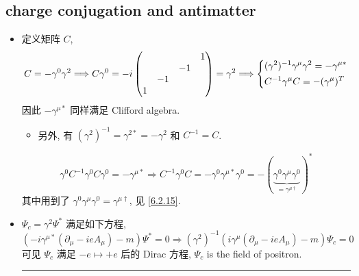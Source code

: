 \subsection{charge conjugation and antimatter}
\begin{itemize}
	\item 定义矩阵 $C$,
	\begin{equation}
		C = - \gamma^0 \gamma^2 \Longrightarrow C \gamma^0 = - i \begin{pmatrix}
			& & & 1 \\
			& & - 1 & \\
			& - 1 & & \\
			1 & & &
		\end{pmatrix} = \gamma^2 \Longrightarrow \begin{dcases}
			(\gamma^2)^{- 1} \gamma^\mu \gamma^2 = - \gamma^{\mu *} \\
			C^{- 1} \gamma^\mu C = - (\gamma^\mu)^T
		\end{dcases}
	\end{equation}
	因此 $- \gamma^{\mu *}$ 同样满足 Clifford algebra.
	\begin{itemize}
		\item 另外, 有 $(\gamma^2)^{- 1} = \gamma^{2 *} = - \gamma^2$ 和 $C^{- 1} = C$.
	\end{itemize}
	
	\begin{tcolorbox}[title=calculation:]
		\begin{equation}
			\gamma^0 C^{- 1} \gamma^0 C \gamma^0 = - \gamma^{\mu *} \Longrightarrow C^{- 1} \gamma^0 C = - \gamma^0 \gamma^{\mu *} \gamma^0 = - (\underbrace{\gamma^0 \gamma^\mu \gamma^0}_{= \gamma^{\mu \dag}})^*
		\end{equation}
		其中用到了 $\gamma^0 \gamma^\mu \gamma^0 = \gamma^{\mu \dag}$, 见 \eqref{6.2.15}.
	\end{tcolorbox}
	
	\item $\Psi_c = \gamma^2 \Psi^*$ 满足如下方程,
	\begin{equation}
		(- i \gamma^{\mu *} (\partial_\mu - i e A_\mu) - m) \Psi^* = 0 \Longrightarrow (\gamma^2)^{- 1} (i \gamma^\mu (\partial_\mu - i e A_\mu) - m) \Psi_c = 0
	\end{equation}
	可见 $\Psi_c$ 满足 $- e \mapsto + e$ 后的 Dirac 方程, $\Psi_c$ is the field of positron.
	
	\noindent\rule[0.5ex]{\linewidth}{0.5pt} %
	

\end{itemize}
